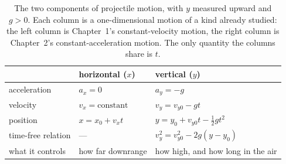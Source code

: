 \documentclass[11pt,twoside,openany]{book}
\begin{document}
\begin{table}[htb]
\centering
\caption{The two components of projectile motion, with $y$ measured upward and $g > 0$. Each column is a one-dimensional motion of a kind already studied: the left column is Chapter~1's constant-velocity motion, the right column is Chapter~2's constant-acceleration motion. The only quantity the columns share is $t$.}
\label{tab:components}
\renewcommand{\arraystretch}{1.5}
\small
\begin{tabular}{lll}
\toprule
 & horizontal ($x$) & vertical ($y$) \\
\midrule
acceleration & $a_x = 0$ & $a_y = -g$ \\
velocity & $v_x = \text{constant}$ & $v_y = v_{y0} - g t$ \\
position & $x = x_0 + v_x t$ & $y = y_0 + v_{y0}t - \tfrac12 g t^2$ \\
time-free relation & --- & $v_y^2 = v_{y0}^2 - 2g(y - y_0)$ \\
what it controls & how far downrange & how high, and how long in the air \\
\bottomrule
\end{tabular}
\end{table}
\end{document}
